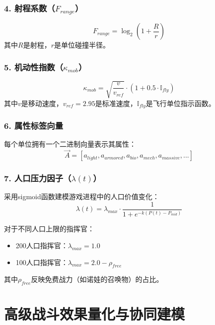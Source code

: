 \documentclass[a4paper,12pt]{article}
\begin{document}
\subsubsection{4. 射程系数（$F_{range}$）}
\begin{equation}
F_{range} = \log_2(1 + \frac{R}{r})
\end{equation}
其中$R$是射程，$r$是单位碰撞半径。

\subsubsection{5. 机动性指数（$\kappa_{mob}$）}
\begin{equation}
\kappa_{mob} = \sqrt{\frac{v}{v_{ref}}} \cdot (1 + 0.5 \cdot \mathbb{I}_{fly})
\end{equation}
其中$v$是移动速度，$v_{ref} = 2.95$是标准速度，$\mathbb{I}_{fly}$是飞行单位指示函数。

\subsubsection{6. 属性标签向量}
每个单位拥有一个二进制向量表示其属性：
\begin{equation}
\vec{A} = [a_{light}, a_{armored}, a_{bio}, a_{mech}, a_{massive}, ...]
\end{equation}

\subsubsection{7. 人口压力因子（$\lambda(t)$）}
采用sigmoid函数建模游戏进程中的人口价值变化：
\begin{equation}
\lambda(t) = \lambda_{max} \cdot \frac{1}{1 + e^{-k(P(t) - P_{mid})}}
\end{equation}

对于不同人口上限的指挥官：
\begin{itemize}
\item 200人口指挥官：$\lambda_{max} = 1.0$
\item 100人口指挥官：$\lambda_{max} = 2.0 - \rho_{free}$
\end{itemize}

其中$\rho_{free}$反映免费战力（如诺娃的召唤物）的占比。

\section{高级战斗效果量化与协同建模}
\end{document}
